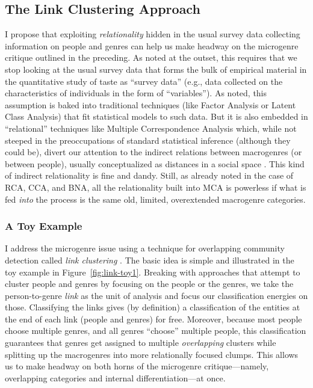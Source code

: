 \documentclass[a4paper,12pt]{extarticle}
\begin{document}
\subsection{The Link Clustering Approach}
I propose that exploiting {\em relationality} hidden in the usual survey data collecting information on people and genres can help us make headway on the microgenre critique outlined in the preceding. As noted at the outset, this requires that we stop looking at the usual survey data that forms the bulk of empirical material in the quantitative study of taste as ``survey data'' (e.g., data collected on the characteristics of individuals in the form of ``variables''). As noted, this assumption is baked into traditional techniques (like Factor Analysis or Latent Class Analysis) that fit statistical models to such data. But it is also embedded in ``relational'' techniques like Multiple Correspondence Analysis which, while not steeped in the preoccupations of standard statistical inference (although they could be), divert our attention to the indirect relations between macrogenres (or between people), usually conceptualized as distances in a social space \citep{flemmen_etal18}. This kind of indirect relationality is fine and dandy. Still, as already noted in the case of RCA, CCA, and BNA, all the relationality built into MCA is powerless if what is fed {\em into} the process is the same old, limited, overextended macrogenre categories. 

\subsubsection{A Toy Example}
I address the microgenre issue using a technique for overlapping community detection called \textit{link clustering} \citep{ahn_etal10}. The basic idea is simple and illustrated in the toy example in Figure~\ref{fig:link-toy1}. Breaking with approaches that attempt to cluster people and genres by focusing on the people or the genres, we take the person-to-genre {\em link} as the unit of analysis and focus our classification energies on those. Classifying the links gives (by definition) a classification of the entities at the end of each link (people and genres) for free. Moreover, because most people choose multiple genres, and all genres ``choose'' multiple people, this classification guarantees that genres get assigned to multiple \textit{overlapping} clusters while splitting up the macrogenres into more relationally focused clumps. This allows us to make headway on both horns of the microgenre critique---namely, overlapping categories and internal differentiation---at once.
\end{document}
